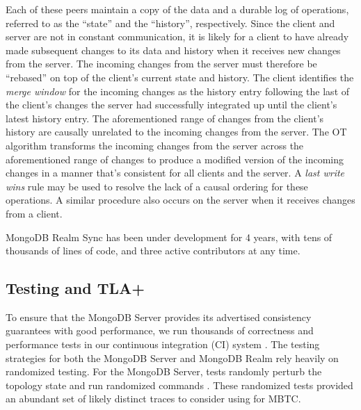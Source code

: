 \documentclass{vldb}
\begin{document}
Each of these peers maintain a copy of the data and a durable log of operations, referred to as the ``state'' and the ``history'', respectively. Since the client and server are not in constant communication, it is likely for a client to have already made subsequent changes to its data and history when it receives new changes from the server. The incoming changes from the server must therefore be ``rebased'' on top of the client's current state and history. The client identifies the \textit{merge window} for the incoming changes as the history entry following the last of the client's changes the server had successfully integrated up until the client's latest history entry. The aforementioned range of changes from the client's history are causally unrelated to the incoming changes from the server. The OT algorithm transforms the incoming changes from the server across the aforementioned range of changes to produce a modified version of the incoming changes in a manner that's consistent for all clients and the server. A \textit{last write wins} rule may be used to resolve the lack of a causal ordering for these operations. A similar procedure also occurs on the server when it receives changes from a client.


MongoDB Realm Sync has been under development for 4 years, with tens of thousands of lines of code, and three active contributors at any time.

\subsection{Testing and TLA+}
\label{subsec:background_testing_tla}

To ensure that the MongoDB Server provides its advertised consistency guarantees with good performance, we run thousands of correctness and performance tests in our continuous integration (CI) system \cite{Daly19iChangePointMongoDB}.
The testing strategies for both the MongoDB Server and MongoDB Realm rely heavily on randomized testing.
For the MongoDB Server, tests randomly perturb the topology state and run randomized commands \cite{Guo17MongoDBFuzzTester}.
These randomized tests provided an abundant set of likely distinct traces to consider using for MBTC.
\end{document}
